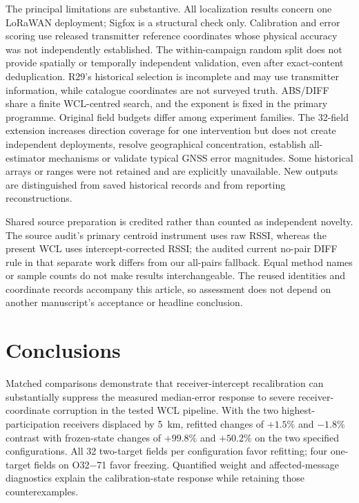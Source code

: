 \documentclass[11pt,a4paper]{article}
\begin{document}
The principal limitations are substantive. All localization results concern one LoRaWAN deployment; Sigfox is a structural check only. Calibration and error scoring use released transmitter reference coordinates whose physical accuracy was not independently established. The within-campaign random split does not provide spatially or temporally independent validation, even after exact-content deduplication. R29's historical selection is incomplete and may use transmitter information, while catalogue coordinates are not surveyed truth. ABS/DIFF share a finite WCL-centred search, and the exponent is fixed in the primary programme. Original field budgets differ among experiment families. The 32-field extension increases direction coverage for one intervention but does not create independent deployments, resolve geographical concentration, establish all-estimator mechanisms or validate typical GNSS error magnitudes. Some historical arrays or ranges were not retained and are explicitly unavailable. New outputs are distinguished from saved historical records and from reporting reconstructions.

Shared source preparation is credited rather than counted as independent novelty. The source audit's primary centroid instrument uses raw RSSI, whereas the present WCL uses intercept-corrected RSSI; the audited current no-pair DIFF rule in that separate work differs from our all-pairs fallback. Equal method names or sample counts do not make results interchangeable. The reused identities and coordinate records accompany this article, so assessment does not depend on another manuscript's acceptance or headline conclusion.

\section{Conclusions}\label{sec:conclusion}
Matched comparisons demonstrate that receiver-intercept recalibration can substantially suppress the measured median-error response to severe receiver-coordinate corruption in the tested WCL pipeline. With the two highest-participation receivers displaced by 5~km, refitted changes of $+1.5\%$ and $-1.8\%$ contrast with frozen-state changes of $+99.8\%$ and $+50.2\%$ on the two specified configurations. All 32 two-target fields per configuration favor refitting; four one-target fields on O32$-$71 favor freezing. Quantified weight and affected-message diagnostics explain the calibration-state response while retaining those counterexamples.
\end{document}

